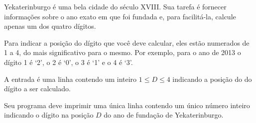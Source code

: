 %
%
%
%

Yekaterinburgo é uma bela cidade do século XVIII. Sua tarefa é fornecer informações sobre o ano exato em que foi fundada e, para facilitá-la, calcule apenas um dos quatro dígitos.

Para indicar a posição do dígito que você deve calcular, eles estão numerados de 1 a 4, do mais significativo para o mesmo. Por exemplo, para o ano de 2013 o dígito 1 é `2', o 2 é `0', o 3 é `1' e o 4 é `3'.


\Entrada%
A entrada é uma linha contendo um inteiro $1 \leq D \leq 4$ indicando a posição do do dígito a ser calculado.

\Saida%
Seu programa deve imprimir uma única linha contendo um único número inteiro indicando o dígito na posição $D$ do ano de fundação de Yekaterinburgo.

%
